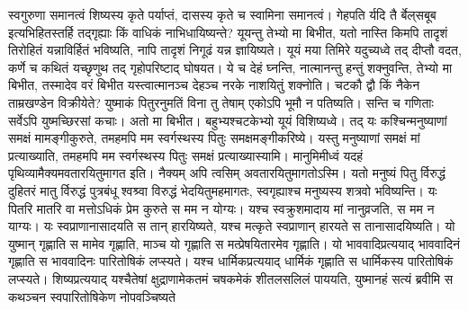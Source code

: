 \vakya स्वगुरुणा समानत्वं शिष्यस्य कृते पर्याप्तं, दासस्य कृते च स्वामिना समानत्वं। गेहपति र्यदि तै र्बेल्‌सबूब इत्यभिहितस्तर्हि तद्गृह्याः किं वाधिकं नाभिधायिष्यन्ते?
\vakya यूयन्तु तेभ्यो मा बिभीत, यतो नास्ति किमपि तादृशं तिरोहितं यन्नाविर्हितं भविष्यति, नापि तादृशं निगूढं यन्न ज्ञायिष्यते।
\vakya यूयं मया तिमिरे यदुच्यध्वे तद् दीप्तौ वदत, कर्णे च कथितं यच्छृणुथ तद् गृहोपरिष्टाद् घोषयत।
\vakya ये च देहं घ्नन्ति, नात्मानन्तु हन्तुं शक्नुवन्ति, तेभ्यो मा बिभीत, तस्मादेव वरं बिभीत यस्त्वात्मानञ्च देहञ्च नरके नाशयितुं शक्नोति।
\vakya चटकौ द्वौ किं नैकेन ताम्रखण्डेन विक्रीयेते? युष्माकं पितुरनुमतिं विना तु तेषाम् एकोऽपि भूमौ न पतिष्यति।
\vakya सन्ति च गणिताः सर्वेऽपि युष्मच्छिरसां कचाः।
\vakya अतो मा बिभीत। बहुभ्यश्चटकेभ्यो यूयं विशिष्यध्वे।
\vakya तद् यः कश्चिन्मनुष्याणां समक्षं मामङ्गीकुरुते, तमहमपि मम स्वर्गस्थस्य पितुः समक्षमङ्गीकरिष्ये।
\vakya यस्तु मनुष्याणां समक्षं मां प्रत्याख्याति, तमहमपि मम स्वर्गस्थस्य पितुः समक्षं प्रत्याख्यास्यामि।
\vakya मानुमिमीध्वं यदहं पृथिव्यामैक्यमवतारयितुमागत इति। नैक्यम् अपि त्वसिम् अवतारयितुमागतोऽस्मि।
\vakya यतो मनुष्यं पितु र्विरुद्धं दुहितरं मातु र्विरुद्धं पुत्रबंधू श्वश्र्वा विरुद्धं भेदयितुमहमागतः,
\vakya स्वगृह्याश्च मनुष्यस्य शत्रवो भविष्यन्ति।
\vakya यः पितरि मातरि वा मत्तोऽधिकं प्रेम कुरुते स मम न योग्यः। यश्च स्वक्रुशमादाय मां नानुव्रजति, स मम न याग्यः।
\vakya यः स्वप्राणानासादयति स तान् हारयिष्यते, यश्च मत्कृते स्वप्राणान् हारयते स तानासादयिष्यति।
\vakya यो युष्मान् गृह्णाति स मामेव गृह्णाति, माञ्च यो गृह्णाति स मत्प्रेषयितारमेव गृह्णाति।
\vakya यो भाववादिप्रत्ययाद् भाववादिनं गृह्णाति स भाववादिनः पारितोषिकं लप्स्यते। यश्च धार्मिकप्रत्ययाद् धार्मिकं गृह्णाति स धार्मिकस्य पारितोषिकं लप्स्यते।
\vakya शिष्यप्रत्ययाद् यश्चैतेषां क्षुद्राणामेकतमं चषकमेकं शीतलसलिलं पाययति, युष्मानहं सत्यं ब्रवीमि स कथञ्चन स्वपारितोषिकेण नोपवञ्चिष्यते\eoc